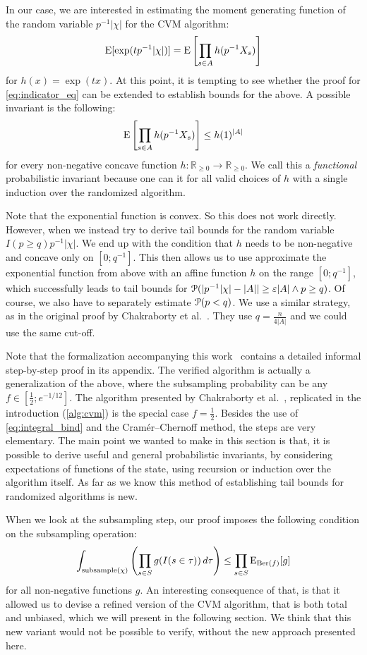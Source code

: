 In our case, we are interested in estimating the moment generating function of the random variable $p^{-1} |\chi|$ for the CVM algorithm:
\[
  \operatorname{\mathrm{E}} [\exp( t p^{-1} |\chi| )] = \operatorname{\mathrm{E}} \left[ \prod_{s \in A} h(p^{-1} X_s) \right]
\]
for $h(x) = \exp(tx)$.
At this point, it is tempting to see whether the proof for \cref{eq:indicator_eq} can be extended to establish bounds for the above.
A possible invariant is the following:
\[
  \operatorname{\mathrm{E}} \left[ \prod_{s \in A} h(p^{-1} X_s) \right] \leq h(1)^{|A|}
\]
for every non-negative concave function $h : \mathbb R_{\geq 0} \rightarrow \mathbb R_{\geq 0}$.
We call this a \emph{functional} probabilistic invariant because one can it for all valid choices of $h$ with a single induction over the randomized algorithm.

Note that the exponential function is convex.
So this does not work directly.
However, when we instead try to derive tail bounds for the random variable $I(p \geq q) p^{-1} |\chi|$.
We end up with the condition that $h$ needs to be non-negative and concave only on $[0;q^{-1}]$.
This then allows us to use approximate the exponential function from above with an affine function $h$ on the range $[0;q^{-1}]$, which successfully leads to tail bounds for $\operatorname{\mathcal P}( |p^{-1} |\chi| - |A|| \geq \varepsilon |A| \wedge p \geq q)$.
Of course, we also have to separately estimate $\operatorname{\mathcal P}(p < q)$.
We use a similar strategy, as in the original proof by Chakraborty et al.~\cite{chakraborty2022}.
They use $q = \frac{n}{4 |A|}$ and we could use the same cut-off.

Note that the formalization accompanying this work~\todo{[cite]} contains a detailed informal step-by-step proof in its appendix.
The verified algorithm is actually a generalization of the above, where the subsampling probability can be any $f \in [\frac{1}{2};e^{-1/12}]$.
The algorithm presented by Chakraborty et al.~\cite{chakraborty2022}, replicated in the introduction (\cref{alg:cvm}) is the special case $f=\frac{1}{2}$.
Besides the use of \cref{eq:integral_bind} and the Cram\'er--Chernoff method, the steps are very elementary.
The main point we wanted to make in this section is that, it is possible to derive useful and general probabilistic invariants, by considering expectations of functions of the state, using recursion or induction over the algorithm itself.
As far as we know this method of establishing tail bounds for randomized algorithms is new.

When we look at the subsampling step, our proof imposes the following condition on the subsampling operation:
\begin{equation}\label{eq:subsample_condition}
  \int_{\mathrm{subsample}(\chi)} \left(\prod_{s \in S} g(I(s \in \tau)) \, d \tau\right) \leq \prod_{s \in S} \operatorname{\mathrm{E}}_{\operatorname{\mathrm{Ber}}(f)} [g]
\end{equation}
for all non-negative functions $g$.
An interesting consequence of that, is that it allowed us to devise a refined version of the CVM algorithm, that is both total and unbiased, which we will present in the following section.
We think that this new variant would not be possible to verify, without the new approach presented here.
